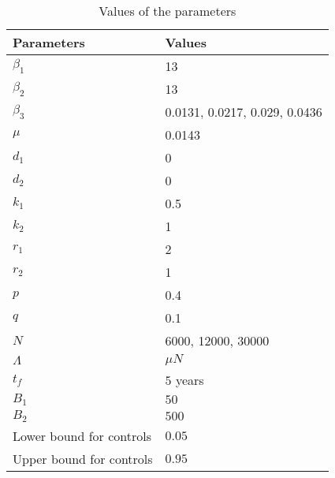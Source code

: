 \begin{table}
	\centering
	\begin{tabular}{ll}
		\toprule
			\textbf{Parameters} & \textbf{Values}
            \\
        \midrule
            $\beta_1$ & 13
            \\
        	$\beta_2$ & 13
			\\
            $\beta_3$ & 0.0131, 0.0217, 0.029, 0.0436
       		\\
     	    $\mu$ & 0.0143
			\\
     	    $d_1$ & 0
     	    \\
     	    $d_2$ & 0
     	    \\
     	    $k_1$ & 0.5
 			\\
     	    $k_2$ & 1
			\\
     	    $r_1$ & 2
     	    \\
     	    $r_2$ & 1
     	    \\
     	    $p$ & 0.4
     	    \\
     	    $q$ & 0.1
			\\
			$N$ & 6000, 12000, 30000
            \\
			$\Lambda$ & $\mu N$
            \\
            $t_f$ & $5$ years
            \\
     	    $B_1$ & $50$
			\\
     	    $B_2$ & $500$
     	    \\
     	    Lower bound for controls & $0.05$
			\\
            Upper bound for controls & $0.95$
       		\\
		\bottomrule
    \end{tabular}
	\caption{Values of the parameters}
\end{table}

